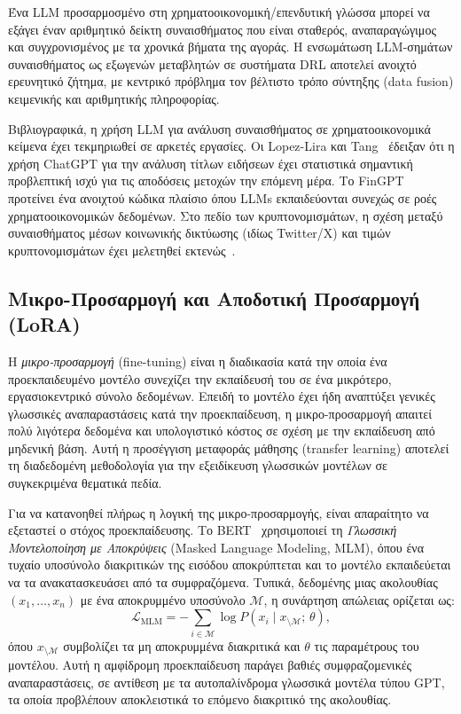 Ένα LLM προσαρμοσμένο στη χρηματοοικονομική/επενδυτική γλώσσα μπορεί να εξάγει
έναν αριθμητικό δείκτη συναισθήματος που είναι σταθερός, αναπαραγώγιμος
και συγχρονισμένος με τα χρονικά βήματα της αγοράς.
Η ενσωμάτωση LLM-σημάτων συναισθήματος ως εξωγενών μεταβλητών σε συστήματα
DRL αποτελεί ανοιχτό ερευνητικό ζήτημα, με κεντρικό πρόβλημα τον βέλτιστο
τρόπο σύντηξης (data fusion) κειμενικής και αριθμητικής πληροφορίας.

Βιβλιογραφικά, η χρήση LLM για ανάλυση συναισθήματος σε χρηματοοικονομικά
κείμενα έχει τεκμηριωθεί σε αρκετές εργασίες. Οι Lopez-Lira και
Tang~\cite{lopezlira2023chatgpt} έδειξαν ότι η χρήση ChatGPT για την ανάλυση τίτλων
ειδήσεων έχει στατιστικά σημαντική προβλεπτική ισχύ για τις αποδόσεις μετοχών
την επόμενη μέρα. Το FinGPT~\cite{yang2023fingpt} προτείνει ένα ανοιχτού κώδικα
πλαίσιο όπου LLMs εκπαιδεύονται συνεχώς σε ροές χρηματοοικονομικών δεδομένων.
Στο πεδίο των κρυπτονομισμάτων, η σχέση μεταξύ συναισθήματος μέσων κοινωνικής
δικτύωσης (ιδίως Twitter/X) και τιμών κρυπτονομισμάτων έχει μελετηθεί
εκτενώς~\cite{kraaijeveld2020twitter}.


\subsection{Μικρο-Προσαρμογή και Αποδοτική Προσαρμογή (LoRA)}
\label{subsec:finetuning}

Η \emph{μικρο-προσαρμογή} (fine-tuning) είναι η διαδικασία κατά την οποία ένα
προεκπαιδευμένο μοντέλο συνεχίζει την εκπαίδευσή του σε ένα μικρότερο,
εργασιοκεντρικό σύνολο δεδομένων. Επειδή το μοντέλο έχει ήδη αναπτύξει
γενικές γλωσσικές αναπαραστάσεις κατά την προεκπαίδευση, η μικρο-προσαρμογή
απαιτεί πολύ λιγότερα δεδομένα και υπολογιστικό κόστος σε σχέση με την
εκπαίδευση από μηδενική βάση. Αυτή η προσέγγιση μεταφοράς μάθησης (transfer
learning) αποτελεί τη διαδεδομένη μεθοδολογία για την εξειδίκευση γλωσσικών
μοντέλων σε συγκεκριμένα θεματικά πεδία.

Για να κατανοηθεί πλήρως η λογική της μικρο-προσαρμογής, είναι απαραίτητο να
εξεταστεί ο στόχος προεκπαίδευσης. Το BERT~\cite{devlin2019bert} χρησιμοποιεί
τη \emph{Γλωσσική Μοντελοποίηση με Αποκρύψεις} (Masked Language Modeling,
MLM), όπου ένα τυχαίο υποσύνολο διακριτικών της εισόδου αποκρύπτεται και το μοντέλο
εκπαιδεύεται να τα ανακατασκευάσει από τα συμφραζόμενα. Τυπικά, δεδομένης
μιας ακολουθίας $(x_1, \ldots, x_n)$ με ένα αποκρυμμένο υποσύνολο
$\mathcal{M}$, η συνάρτηση απώλειας ορίζεται ως:
\begin{equation}
    \mathcal{L}_{\mathrm{MLM}}
    = -\sum_{i \in \mathcal{M}} \log P\!\left(x_i \mid x_{\setminus \mathcal{M}};\, \theta\right),
    \label{eq:mlm}
\end{equation}
όπου $x_{\setminus \mathcal{M}}$ συμβολίζει τα μη αποκρυμμένα διακριτικά και
$\theta$ τις παραμέτρους του μοντέλου. Αυτή η αμφίδρομη προεκπαίδευση παράγει
βαθιές συμφραζομενικές αναπαραστάσεις, σε αντίθεση με τα αυτοπαλίνδρομα
γλωσσικά μοντέλα τύπου GPT, τα οποία προβλέπουν αποκλειστικά το επόμενο
διακριτικό της ακολουθίας.


